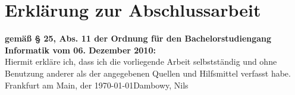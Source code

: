\newpage

\thispagestyle{empty}
\section*{Erklärung zur Abschlussarbeit}
\thispagestyle{empty}
\textbf{gemäß § 25, Abs. 11 der Ordnung für den Bachelorstudiengang Informatik vom 06. Dezember 2010:}\\
Hiermit erkläre ich, dass ich die vorliegende Arbeit selbstständig und ohne Benutzung 
anderer als der angegebenen Quellen und Hilfsmittel verfasst habe. 
\vspace{4\baselineskip}\\
Frankfurt am Main, der \today \hfill Dambowy, Nils
\vspace{4\baselineskip}\\
